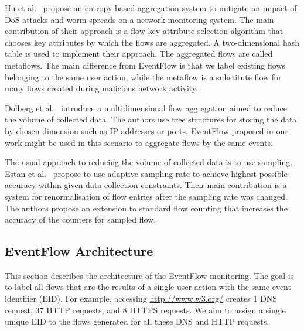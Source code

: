 Hu et al.~\cite{Hu-2009-Entropy} propose an entropy-based aggregation system to mitigate an impact of DoS attacks and worm spreads on a network monitoring system. The main contribution of their approach is a flow key attribute selection algorithm that chooses key attributes by which the flows are aggregated. A two-dimensional hash table is used to implement their approach. The aggregated flows are called metaflows. The main difference from EventFlow is that we label existing flows belonging to the same user action, while the metaflow is a substitute flow for many flows created during malicious network activity.

Dolberg et al.~\cite{Dolberg-2012-Efficient} introduce a multidimensional flow aggregation aimed to reduce the volume of collected data. The authors use tree structures for storing the data by chosen dimension such as IP addresses or ports. EventFlow proposed in our work might be used in this scenario to aggregate flows by the same events.

The usual approach to reducing the volume of collected data is to use sampling. Estan et al.~\cite{Estan-2004-Building} propose to use adaptive sampling rate to achieve highest possible accuracy within given data collection constraints. Their main contribution is a system for renormalisation of flow entries after the sampling rate was changed. The authors propose an extension to standard flow counting that increases the accuracy of the counters for sampled flow.


\subsection{EventFlow Architecture} \label{subsec:eventflow-architecture}

This section describes the architecture of the EventFlow monitoring. The goal is to label all flows that are the results of a single user action with the same event identifier (EID). For example, accessing \url{http://www.w3.org/} creates 1 DNS request, 37 HTTP requests, and 8 HTTPS requests. We aim to assign a single unique EID to the flows generated for all these DNS and HTTP requests.

